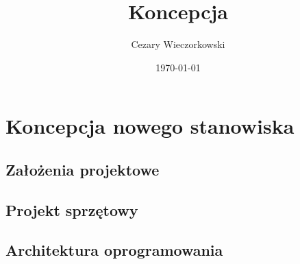 \documentclass[../main.tex]{subfiles}
\author{Cezary Wieczorkowski}
\date{\today}
\title{Koncepcja}
\begin{document}
\section{Koncepcja nowego stanowiska}

\subsection{Założenia projektowe}

\subsection{Projekt sprzętowy}

\subsection{Architektura oprogramowania}
\end{document}
